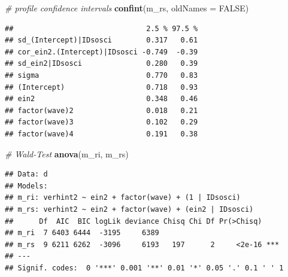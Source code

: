 \documentclass[
]{book}
\newenvironment{Shaded}{\begin{snugshade}}{\end{snugshade}}
\newcommand{\CommentTok}[1]{\textcolor[rgb]{0.56,0.35,0.01}{\textit{#1}}}
\newcommand{\DataTypeTok}[1]{\textcolor[rgb]{0.13,0.29,0.53}{#1}}
\newcommand{\KeywordTok}[1]{\textcolor[rgb]{0.13,0.29,0.53}{\textbf{#1}}}
\newcommand{\NormalTok}[1]{#1}
\newcommand{\OtherTok}[1]{\textcolor[rgb]{0.56,0.35,0.01}{#1}}
\begin{document}
\begin{Shaded}
\begin{Highlighting}[]
\CommentTok{# profile confidence intervals}
\KeywordTok{confint}\NormalTok{(m_rs, }\DataTypeTok{oldNames =} \OtherTok{FALSE}\NormalTok{)}
\end{Highlighting}
\end{Shaded}

\begin{verbatim}
##                               2.5 % 97.5 %
## sd_(Intercept)|IDsosci        0.317   0.61
## cor_ein2.(Intercept)|IDsosci -0.749  -0.39
## sd_ein2|IDsosci               0.280   0.39
## sigma                         0.770   0.83
## (Intercept)                   0.718   0.93
## ein2                          0.348   0.46
## factor(wave)2                 0.018   0.21
## factor(wave)3                 0.102   0.29
## factor(wave)4                 0.191   0.38
\end{verbatim}

\begin{Shaded}
\begin{Highlighting}[]
\CommentTok{# Wald-Test}
\KeywordTok{anova}\NormalTok{(m_ri, m_rs)}
\end{Highlighting}
\end{Shaded}

\begin{verbatim}
## Data: d
## Models:
## m_ri: verhint2 ~ ein2 + factor(wave) + (1 | IDsosci)
## m_rs: verhint2 ~ ein2 + factor(wave) + (ein2 | IDsosci)
##      Df  AIC  BIC logLik deviance Chisq Chi Df Pr(>Chisq)    
## m_ri  7 6403 6444  -3195     6389                            
## m_rs  9 6211 6262  -3096     6193   197      2     <2e-16 ***
## ---
## Signif. codes:  0 '***' 0.001 '**' 0.01 '*' 0.05 '.' 0.1 ' ' 1
\end{verbatim}
\end{document}
